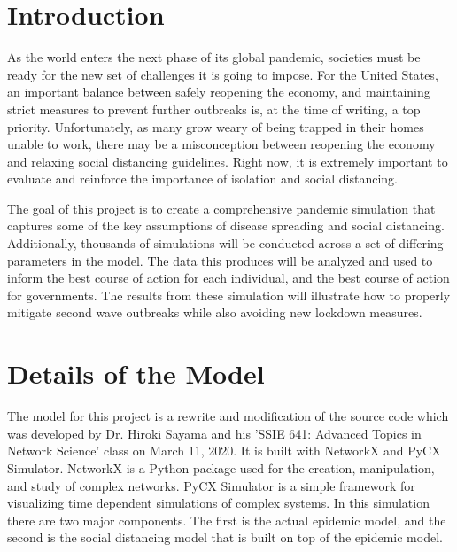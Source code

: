 \documentclass[12pt]{article}
\begin{document}
\begin{multicols}{2}

\section{Introduction}
As the world enters the next phase of its global pandemic, societies must be ready for the new set of challenges it is going to impose.
For the United States, an important balance between safely reopening the economy, and maintaining strict measures to prevent further outbreaks is, at the time of writing, a top priority.
Unfortunately, as many grow weary of being trapped in their homes unable to work, there may be a misconception between reopening the economy and relaxing social distancing guidelines.
Right now, it is extremely important to evaluate and reinforce the importance of isolation and social distancing.

The goal of this project is to create a comprehensive pandemic simulation that captures some of the key assumptions of disease spreading and social distancing.
Additionally, thousands of simulations will be conducted across a set of differing parameters in the model.
The data this produces will be analyzed and used to inform the best course of action for each individual, and the best course of action for governments.
The results from these simulation will illustrate how to properly mitigate second wave outbreaks while also avoiding new lockdown measures.

\section{Details of the Model}
The model for this project is a rewrite and modification of the source code which was developed by Dr. Hiroki Sayama and his 'SSIE 641: Advanced Topics in Network Science' class on March 11, 2020.
It is built with NetworkX and PyCX Simulator. NetworkX is a Python package used for the creation, manipulation, and study of complex networks.
PyCX Simulator is a simple framework for visualizing time dependent simulations of complex systems.
In this simulation there are two major components.
The first is the actual epidemic model, and the second is the social distancing model that is built on top of the epidemic model.


\end{multicols}
\end{document}
